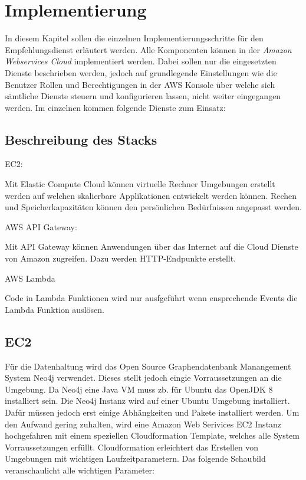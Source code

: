\section{Implementierung}\label{implementaion}


 In diesem Kapitel sollen die einzelnen Implementierungsschritte für den Empfehlungsdienst erläutert werden. Alle Komponenten können in der \textit{Amazon Webservices Cloud} implementiert werden. Dabei sollen nur die eingesetzten Dienste beschrieben werden, jedoch auf grundlegende Einstellungen wie die Benutzer Rollen und Berechtigungen in der AWS Konsole über welche sich sämtliche Dienste steuern und konfigurieren lassen, nicht weiter eingegangen werden. Im einzelnen kommen folgende Dienste zum Einsatz:

\subsection{Beschreibung des Stacks}

EC2:

Mit Elastic Compute Cloud können virtuelle Rechner Umgebungen erstellt werden auf welchen skalierbare Applikationen entwickelt werden können. Rechen und Speicherkapazitäten können den persönlichen Bedürfnissen angepasst werden. 

AWS API Gateway:

Mit API Gateway können Anwendungen über das Internet auf die Cloud Dienste von Amazon zugreifen. Dazu werden HTTP-Endpunkte erstellt.

AWS Lambda

Code in Lambda Funktionen wird nur ausfgeführt wenn ensprechende Events die Lambda Funktion auslösen.

  \subsection{EC2 }
Für die Datenhaltung wird das Open Source Graphendatenbank Manangement System Neo4j verwendet. Dieses stellt jedoch eingie Vorraussetzungen an die Umgebung\cite{neo4jsysreq}. Da Neo4j eine Java VM muss zb. für Ubuntu das OpenJDK 8 installiert sein.
Die Neo4j Instanz wird auf einer Ubuntu Umgebung installiert. Dafür müssen jedoch erst einige Abhängkeiten und Pakete installiert werden. Um den Aufwand gering zuhalten, wird eine Amazon Web Serivices EC2 Instanz hochgefahren mit einem speziellen Cloudformation Template, welches alle System Vorraussetzungen erfüllt. Cloudformation erleichtert das Erstellen von Umgebungen mit wichtigen Laufzeitparametern. Das folgende Schaubild veranschaulicht alle wichtigen Parameter:

